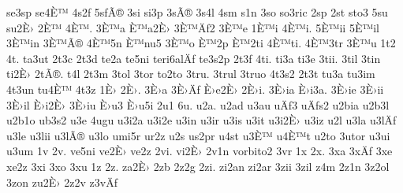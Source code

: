 {se3sp
se4È™
4s2f
5sfÃ®
3si
si3p
3sÃ®
3s4l
4sm
s1n
3so
so3ric
2sp
2st
sto3
5su
su2È›
2È™
4È™.
3È™a
È™a2È›
3È™Äƒ2
3È™e
1È™i
4È™i.
5È™ii
5È™il
3È™in
3È™Ã®
4È™5n
È™nu5
3È™o
È™2p
È™2ti
4È™ti.
4È™3tr
3È™u
1t2
4t.
ta3ut
2t3c
2t3d
te2a
te5ni
teri6alÄƒ
te3s2p
2t3f
4ti.
ti3a
ti3e
3tii.
3til
3tin
ti2È›
2tÃ®.
t4l
2t3m
3tol
3tor
to2to
3tru.
3trul
3truo
4t3s2
2t3t
tu3a
tu3im
4t3un
tu4È™
4t3z
1È›
2È›.
3È›a
3È›Äƒ
È›e2È›
2È›i.
3È›ia
È›i3a.
3È›ie
3È›ii
3È›il
È›i2È›
3È›iu
È›u3
È›u5i
2u1
6u.
u2a.
u2ad
u3au
uÄƒ3
uÄƒs2
u2bia
u2b3l
u2b1o
ub3s2
u3e
4ugu
u3i2a
u3i2e
u3in
u3ir
u3is
u3it
u3i2È›
u3iz
u2l
u3la
u3lÄƒ
u3le
u3lii
u3lÃ®
u3lo
umi5r
ur2z
u2s
us2pr
u4st
u3È™
u4È™t
u2to
3utor
u3ui
u3um
1v
2v.
ve5ni
ve2È›
ve2z
2vi.
vi2È›
2v1n
vorbito2
3vr
1x
2x.
3xa
3xÄƒ
3xe
xe2z
3xi
3xo
3xu
1z
2z.
za2È›
2zb
2z2g
2zi.
zi2an
zi2ar
3zii
3zil
z4m
2z1n
3z2ol
3zon
zu2È›
2z2v
z3vÄƒ
}
